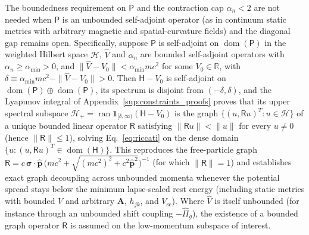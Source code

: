 \documentclass[aps,prd,onecolumn,tightenlines,nofootinbib,notitlepage,11pt,floatfix]{revtex4-2}
\theoremstyle{indentedtheorem}
\begin{document}
The boundedness requirement on $\mathsf{P}$ and the contraction cap $\alpha_n<2$ are not needed when $\mathsf{P}$ is an unbounded self-adjoint operator (as in continuum static metrics with arbitrary magnetic and spatial-curvature fields) and the diagonal gap remains open. Specifically, suppose $\mathsf{P}$ is self-adjoint on $\operatorname{dom}(\mathsf{P})$ in the weighted Hilbert space $\mathcal{H}$, $\hat{V}$ and $\alpha_n$ are bounded self-adjoint operators with $\alpha_n\ge\alpha_{\min}>0$, and $\|\hat{V}-V_0\|<\alpha_{\min}mc^2$ for some $V_0\in\mathbb{R}$, with $\delta\equiv\alpha_{\min}mc^2-\|\hat{V}-V_0\|>0$. Then $\mathsf{H}-V_0$ is self-adjoint on $\operatorname{dom}(\mathsf{P})\oplus\operatorname{dom}(\mathsf{P})$, its spectrum is disjoint from $(-\delta,\delta)$, and the Lyapunov integral of Appendix~\ref{sup:constraints_proofs} proves that its upper spectral subspace $\mathcal{H}_+=\operatorname{ran}\mathbf{1}_{[\delta,\infty)}(\mathsf{H}-V_0)$ is the graph $\{(u,\mathsf{R}u)^T : u\in\mathcal{H}\}$ of a unique bounded linear operator $\mathsf{R}$ satisfying $\|\mathsf{R}u\|<\|u\|$ for every $u\neq 0$ (hence $\|\mathsf{R}\|\le 1$), solving Eq.~\eqref{eq:riccati} on the dense domain $\{u : (u,\mathsf{R}u)^T\in\operatorname{dom}(\mathsf{H})\}$. This reproduces the free-particle graph $\mathsf{R}=c\,\boldsymbol{\sigma}\cdot\hat{\mathbf{p}}\,\big(mc^2+\sqrt{(mc^2)^2+c^2\hat{\mathbf{p}}^2}\big)^{-1}$ (for which $\|\mathsf{R}\|=1$) and establishes exact graph decoupling across unbounded momenta whenever the potential spread stays below the minimum lapse-scaled rest energy (including static metrics with bounded $V$ and arbitrary $\mathbf{A}$, $h_{jk}$, and $V_\text{sc}$). Where $\hat{V}$ is itself unbounded (for instance through an unbounded shift coupling $-\hat{\Pi}_g$), the existence of a bounded graph operator $\mathsf{R}$ is assumed on the low-momentum subspace of interest.
\end{document}
